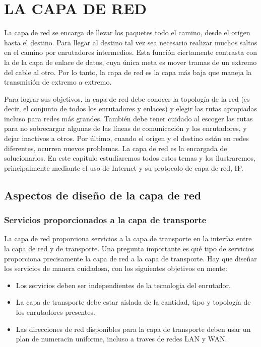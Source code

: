 
\chapter{LA CAPA DE RED}

	\par La capa de red se encarga de llevar los paquetes todo el camino, desde el origen hasta el destino. Para llegar al destino tal vez sea necesario realizar muchos saltos en el camino por enrutadores intermedios. Esta función ciertamente contrasta con la de la capa de enlace de datos, cuya única meta es mover tramas de un extremo del cable al otro. Por lo tanto, la capa de red es la capa más baja que maneja la transmisión de extremo a extremo.

	\par Para lograr sus objetivos, la capa de red debe conocer la topología de la red (es
decir, el conjunto de todos los enrutadores y enlaces) y elegir las rutas apropiadas
incluso para redes más grandes. También debe tener cuidado al escoger las rutas para
no sobrecargar algunas de las líneas de comunicación y los enrutadores, y dejar
inactivos a otros. Por último, cuando el origen y el destino están en redes diferentes, ocurren nuevos problemas. La capa de red es la encargada de solucionarlos. En este capítulo estudiaremos todos estos temas y los ilustraremos, principalmente mediante el uso de Internet y su protocolo de capa de red, IP.

\section{Aspectos de diseño de la capa de red}

	\subsection{Servicios proporcionados a la capa de transporte}

		\par La capa de red proporciona servicios a la capa de transporte en la interfaz entre la 
capa de red y de transporte. Una pregunta importante es qué tipo de servicios 
proporciona precisamente la capa de red a la capa de transporte. Hay que diseñar los 
servicios de manera cuidadosa, con los siguientes objetivos en mente:
	\begin{itemize}
		\item Los servicios deben ser independientes de la tecnologia del 			
		enrutador.
		\item La capa de transporte debe estar aislada de la cantidad, tipo y topología 
		de los enrutadores presentes.
		\item Las direcciones de red disponibles para la capa de transporte deben usar 
		un plan de numeracin uniforme, incluso a traves de redes LAN y WAN.
	\end{itemize}
	
